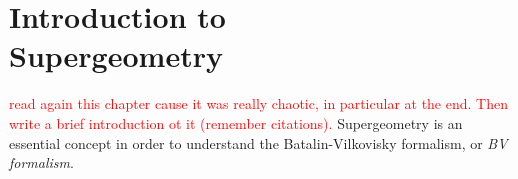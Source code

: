\chapter[Introduction to Supergeometry]{Introduction to \\ Supergeometry}
\label{chap:intro_supergeom}

\textcolor{red}{read again this chapter cause it was really chaotic, in particular at the end. Then write a brief introduction ot it (remember citations).}
Supergeometry is an essential concept in order to understand the Batalin-Vilkovisky formalism, or \emph{BV formalism}.




